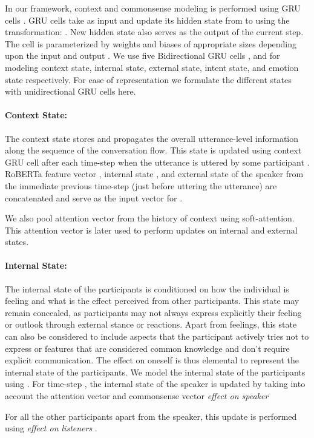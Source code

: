 \documentclass[11pt,a4paper]{article}
\begin{document}
In our framework, context and commonsense modeling is performed using GRU cells \cite{chung2014empirical}. GRU cells take as input  and update its hidden state from  to  using the transformation: . New hidden state  also serves as the output of the current step. The cell is parameterized by weights  and biases  of appropriate sizes depending upon the
input  and output .
We use five Bidirectional GRU cells , and  for modeling context state, internal state, external state, intent state, and emotion state respectively. For ease of representation we formulate the different states with unidirectional GRU cells here.

\paragraph{Context State:}
The context state stores and propagates the overall utterance-level information
along the sequence of the conversation flow. This state is updated using context GRU cell  after each time-step  when the utterance is uttered by some participant . RoBERTa feature vector , internal state , and external state  of the speaker from the immediate previous time-step (just before uttering the utterance) are concatenated and serve as the input vector for .

We also pool attention vector  from the history of context  using soft-attention. This attention vector is later used to perform updates on internal and external states.


\paragraph{Internal State:}
The internal state of the participants is conditioned on how the individual is feeling and what is the effect perceived from other participants.
This state may remain concealed,  as participants may not always express explicitly their feeling or outlook through external stance or reactions. Apart from feelings, this state can also be considered to include aspects that the participant actively tries not to express or features that are considered common knowledge and don't require explicit communication. The effect on oneself is thus elemental to represent the internal state of the participants. We model the internal state of the participants using . For time-step , the internal state of the speaker  is updated by taking into account the attention vector  and commonsense vector \textit{effect on speaker} 

For all the other participants apart from the speaker, this update is performed using \textit{effect on listeners} .
\end{document}
